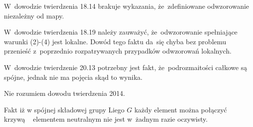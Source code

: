 \documentclass[a4paper,11pt]{article}
\begin{document}
\vspace{\spaceFour}



\start {} W~dowodzie twierdzenia 18.14 brakuje wykazania,
że~zdefiniowane odwzorowanie niezależny od mapy.

\vspace{\spaceFour}



\start {} W~dowodzie twierdzenia 18.19 należy zauważyć,
że~odwzorowanie spełniające warunki (2)-(4) jest lokalne. Dowód tego
faktu da~się chyba bez problemu przenieść z~poprzednio rozpatrywanych
przypadków odwzorowań lokalnych.

\vspace{\spaceFour}



\start {} W~dowodzie twierdzenie 20.13 potrzebny jest fakt,
że~podrozmaitości całkowe są spójne, jednak nie ma pojęcia skąd to
wynika.

\vspace{\spaceFour}



\start {} Nie rozumiem dowodu twierdzenia 2014.

\vspace{\spaceFour}



\start {} Fakt iż w spójnej składowej grupy Liego $G$ każdy
element można połączyć krzywą ~ elementem neutralnym nie jest w~żadnym
razie oczywisty.

\vspace{\spaceFour}













\end{document}

